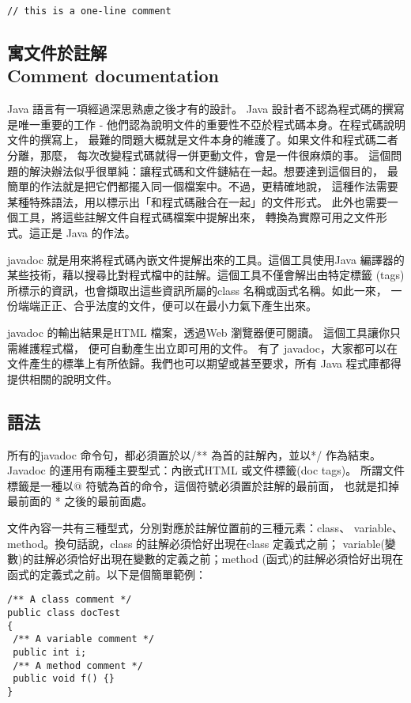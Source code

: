 \begin{Verbatim}[frame=single]
// this is a one-line comment
\end{Verbatim}

\subsection{寓文件於註解 \\
Comment documentation}
Java 語言有一項經過深思熟慮之後才有的設計。
Java 設計者不認為程式碼的撰寫是唯一重要的工作 -
他們認為說明文件的重要性不亞於程式碼本身。在程式碼說明文件的撰寫上，
最難的問題大概就是文件本身的維護了。如果文件和程式碼二者分離，那麼，
每次改變程式碼就得一併更動文件，會是一件很麻煩的事。
這個問題的解決辦法似乎很單純：讓程式碼和文件鏈結在一起。想要達到這個目的，
最簡單的作法就是把它們都擺入同一個檔案中。不過，更精確地說，
這種作法需要某種特殊語法，用以標示出「和程式碼融合在一起」的文件形式。
此外也需要一個工具，將這些註解文件自程式碼檔案中提解出來，
轉換為實際可用之文件形式。這正是 Java 的作法。

javadoc 就是用來將程式碼內嵌文件提解出來的工具。這個工具使用Java
編譯器的某些技術，藉以搜尋比對程式檔中的註解。這個工具不僅會解出由特定標籤
(tags)所標示的資訊，也會擷取出這些資訊所屬的class 名稱或函式名稱。如此一來，
一份端端正正、合乎法度的文件，便可以在最小力氣下產生出來。

javadoc 的輸出結果是HTML 檔案，透過Web 瀏覽器便可閱讀。
這個工具讓你只需維護程式檔， 便可自動產生出立即可用的文件。
有了
javadoc，大家都可以在文件產生的標準上有所依歸。我們也可以期望或甚至要求，所有
Java 程式庫都得提供相關的說明文件。

\subsection{語法}

所有的javadoc 命令句，都必須置於以/** 為首的註解內，並以*/ 作為結束。
Javadoc 的運用有兩種主要型式：內嵌式HTML 或文件標籤(doc tags)。
所謂文件標籤是一種以@ 符號為首的命令，這個符號必須置於註解的最前面，
也就是扣掉最前面的 * 之後的最前面處。

文件內容一共有三種型式，分別對應於註解位置前的三種元素：class、
variable、method。換句話說，class 的註解必須恰好出現在class 定義式之前；
variable(變數)的註解必須恰好出現在變數的定義之前；method
(函式)的註解必須恰好出現在函式的定義式之前。以下是個簡單範例：

\begin{Verbatim}[frame=single]
/** A class comment */
public class docTest 
{
 /** A variable comment */
 public int i;
 /** A method comment */
 public void f() {}
}
\end{Verbatim}

